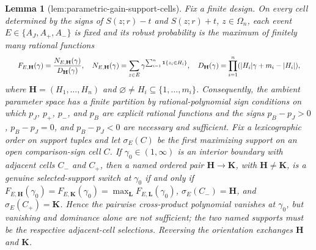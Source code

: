 \documentclass{article}
\newtheorem{lemma}{Lemma}
\begin{document}
\begin{lemma}[lem:parametric-gain-support-cells]\label{lem:parametric-gain-support-cells}
Fix a finite design. On every cell determined by the signs of \(S(z;r)-t\) and \(S(z;r)+t\), \(z\in\Omega_n\), each event \(E\in\{A_J,A_+,A_-\}\) is fixed and its robust probability is the maximum of finitely many rational functions \[
\makebox[\linewidth][c]{\resizebox{0.98\linewidth}{!}{\par\noindent \makebox[\linewidth][c]{\resizebox{0.98\linewidth}{!}{\(\displaystyle \displaystyle F_{E,\mathbf H}(\gamma)=\frac{N_{E,\mathbf H}(\gamma)}{D_{\mathbf H}(\gamma)},\quad N_{E,\mathbf H}(\gamma)=\sum_{z\in E}\gamma^{\sum_{i=1}^n\mathbf 1\{z_i\in H_i\}},\quad D_{\mathbf H}(\gamma)=\prod_{i=1}^n(|H_i|\gamma+m_i-|H_i|),\)}}\par\noindent}}
\] where \(\mathbf H=(H_1,\ldots,H_n)\) and \(\varnothing\ne H_i\subseteq\{1,\ldots,m_i\}\). Consequently, the ambient parameter space has a finite partition by rational-polynomial sign conditions on which \(p_J\), \(p_+\), \(p_-\), and \(p_B\) are explicit rational functions and the signs \(p_B-p_J>0\), \(p_B-p_J=0\), and \(p_B-p_J<0\) are necessary and sufficient. Fix a lexicographic order on support tuples and let \(\sigma_E(C)\) be the first maximizing support on an open comparison-sign cell \(C\). If \(\gamma_0\in(1,\infty)\) is an interior boundary with adjacent cells \(C_-\) and \(C_+\), then a named ordered pair \(\mathbf H\to\mathbf K\), with \(\mathbf H\ne\mathbf K\), is a genuine selected-support switch at \(\gamma_0\) if and only if \(F_{E,\mathbf H}(\gamma_0)=F_{E,\mathbf K}(\gamma_0)=\max_{\mathbf L}F_{E,\mathbf L}(\gamma_0)\), \(\sigma_E(C_-)=\mathbf H\), and \(\sigma_E(C_+)=\mathbf K\). Hence the pairwise cross-product polynomial vanishes at \(\gamma_0\), but vanishing and dominance alone are not sufficient; the two named supports must be the respective adjacent-cell selections. Reversing the orientation exchanges \(\mathbf H\) and \(\mathbf K\).
\end{lemma}
\end{document}

